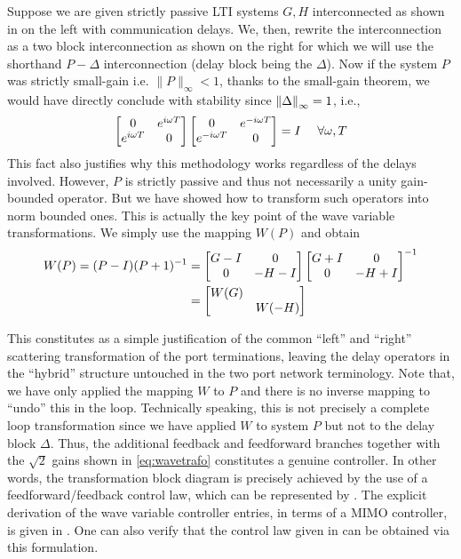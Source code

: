 Suppose we are given strictly passive LTI systems $G,H$ interconnected as shown in  on the 
left with communication delays. We, then, rewrite the interconnection as a two block interconnection as shown on 
the right for which we will use the shorthand $P-\Delta$ interconnection (delay block being the $\Delta$). Now if 
the system $P$ was strictly small-gain i.e. \(\|P\|_\infty< 1\),  thanks to the small-gain theorem, we would have 
directly conclude with stability since $\displaystyle \left\| \Delta \right\|_\infty = 1$, i.e.,
\[
\begin{bmatrix}0 &e^{i\omega T}\\e^{i\omega T}&0\end{bmatrix}\begin{bmatrix}0 &e^{-i\omega T}\\e^{-i\omega T}&0\end{bmatrix}= I \quad \ \forall\omega,T 
\]
This fact also justifies why this methodology works regardless of the delays involved. However, $P$ is strictly 
passive and thus not necessarily a unity gain-bounded operator. But we have showed how to transform 
such operators into norm bounded ones. This is actually the key point of the wave variable transformations. We 
simply use the mapping $W(P)$ and obtain 
\begin{align}
W(P) = (P-I)(P+1)^{-1} &= \begin{bmatrix}G-I & 0\\0 &-H-I\end{bmatrix}\begin{bmatrix}G+I & 0\\0 &-H+I\end{bmatrix}^{-1}\\ &= \begin{bmatrix}W(G) &\\&W(-H)\end{bmatrix}
\end{align}

This constitutes as a simple justification of the common \enquote{left} and \enquote{right} scattering transformation 
of the port terminations, leaving the delay operators in the \enquote{hybrid} structure untouched in the two port network 
terminology. Note that, we have only applied the mapping $W$ to $P$ and there is no inverse mapping to \enquote{undo} 
this in the loop. Technically speaking, this is not precisely a complete loop transformation since we have applied $W$
to system $P$ but not to the delay block $\Delta$. Thus, the additional feedback and feedforward branches together with 
the $\sqrt{2}$ gains shown in \eqref{eq:wavetrafo} constitutes a genuine controller. In other words, the transformation 
block diagram is precisely achieved by the use of a feedforward/feedback control law, which can be represented by 
. The explicit derivation of the wave variable controller entries, in terms of a MIMO controller, 
is given in \cite{christiansson2008}. One can also verify that the control law given in \cite{andersonspong} can be 
obtained via this formulation. 

